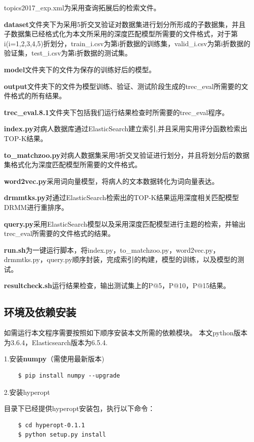\documentclass[a4paper]{article}
\begin{document}
topics2017\_exp.xml为采用查询拓展后的检索文件。
\par
\textbf{dataset}文件夹下为采用5折交叉验证对数据集进行划分所形成的子数据集，并且子数据集已经格式化为本文所采用的深度匹配模型所需要的文件格式，对于第i(i=1,2,3,4,5)折划分，train\_i.csv为第i折数据的训练集，valid\_i.csv为第i折数据的验证集，test\_i.csv为第i折数据的测试集。
\par
\textbf{model}文件夹下的文件为保存的训练好后的模型。
\par
\textbf{output}文件夹下的文件为模型训练、验证、测试阶段生成的trec\_eval所需要的文件格式的所有结果。
\par
\textbf{trec\_eval.8.1}文件夹下包括我们运行结果检查时所需要的trec\_eval程序。
\par
\textbf{index.py}对病人数据库通过ElasticSearch建立索引,并且采用实用评分函数检索出TOP-K结果。
\par
\textbf{to\_matchzoo.py}对病人数据集采用5折交叉验证进行划分，并且将划分后的数据集格式化为深度匹配模型所需要的文件格式。
\par
\textbf{word2vec.py}采用词向量模型，将病人的文本数据转化为词向量表达。
\par
\textbf{drmmtks.py}对通过ElasticSearch检索出的TOP-K结果运用深度相关匹配模型DRMM进行重排序。
\par
\textbf{query.py}采用ElasticSearch模型以及采用深度匹配模型进行主题的检索，并输出trec\_eval所需要的文件格式的结果。
\par
\textbf{run.sh}为一键运行脚本，将index.py，to\_matchzoo.py，word2vec.py，drmmtks.py，query.py顺序封装，完成索引的构建，模型的训练，以及模型的测试。
\par
\textbf{resultcheck.sh}运行结果检查，输出测试集上的P@5，P@10，P@15结果。
\subsection{环境及依赖安装}
如需运行本文程序需要按照如下顺序安装本文所需的依赖模块。
本文python版本为3.6.4，Elasticsearch版本为6.5.4.

1.安装\textbf{numpy}（需使用最新版本)
\begin{verbatim}
    $ pip install numpy --upgrade
\end{verbatim}

2.安装hyperopt

目录下已经提供hyperopt安装包，执行以下命令：
\begin{verbatim}
    $ cd hyperopt-0.1.1
    $ python setup.py install
\end{verbatim}
\end{document}
